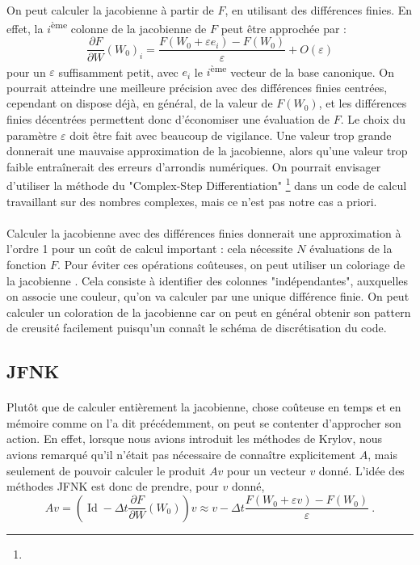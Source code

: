     \paragraph{}
    On peut calculer la jacobienne à partir de $F$, en utilisant des différences finies.
    En effet, la $i$\textsuperscript{ème} colonne de la jacobienne de $F$ peut être approchée par :
    \[\frac{\partial F}{\partial W}\left(W_0\right)_i = \frac{F\left(W_0 + \varepsilon e_i\right) - F\left(W_0\right)}{\varepsilon} + O\left(\varepsilon\right)\]
    pour un $\varepsilon$ suffisamment petit, avec $e_i$ le $i$\textsuperscript{ème} vecteur de la base canonique.
    On pourrait atteindre une meilleure précision avec des différences finies centrées, cependant on dispose déjà, en général, de la valeur de $F\left(W_0\right)$, et les différences finies décentrées permettent donc d'économiser une évaluation de $F$.
    Le choix du paramètre $\varepsilon$ doit être fait avec beaucoup de vigilance.
    Une valeur trop grande donnerait une mauvaise approximation de la jacobienne, alors qu'une valeur trop faible entraînerait des erreurs d'arrondis numériques.
    On pourrait envisager d'utiliser la méthode du "Complex-Step Differentiation" \footnote{} dans un code de calcul travaillant sur des nombres complexes, mais ce n'est pas notre cas a priori.

    \paragraph{}
    Calculer la jacobienne avec des différences finies donnerait une approximation à l'ordre 1 pour un coût de calcul important : cela nécessite $N$ évaluations de la fonction $F$.
    Pour éviter ces opérations coûteuses, on peut utiliser un coloriage de la jacobienne \cite{GebremedhinMannePothen2005}.
    Cela consiste à identifier des colonnes "indépendantes", auxquelles on associe une couleur, qu'on va calculer par une unique différence finie.
    On peut calculer un coloration de la jacobienne car on peut en général obtenir son pattern de creusité facilement puisqu'un connaît le schéma de discrétisation du code.


  \subsection{JFNK}

    \paragraph{}
    Plutôt que de calculer entièrement la jacobienne, chose coûteuse en temps et en mémoire comme on l'a dit précédemment, on peut se contenter d'approcher son action.
    En effet, lorsque nous avions introduit les méthodes de Krylov, nous avions remarqué qu'il n'était pas nécessaire de connaître explicitement $A$, mais seulement de pouvoir calculer le produit $Av$ pour un vecteur $v$ donné.
    L'idée des méthodes JFNK est donc de prendre, pour $v$ donné,
    \[Av = \left(\operatorname{Id} - \Delta t\frac{\partial F}{\partial W}\left(W_0\right)\right)v \approx v - \Delta t\frac{F\left(W_0 + \varepsilon v\right) - F\left(W_0\right)}{\varepsilon}\ .\]

